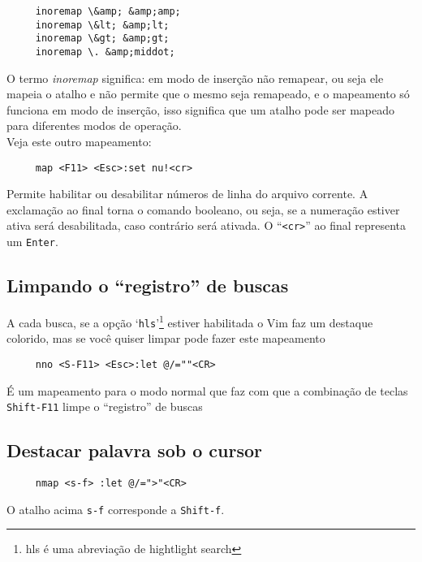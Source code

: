 \begin{verbatim}
     inoremap \&amp; &amp;amp;
     inoremap \&lt; &amp;lt;
     inoremap \&gt; &amp;gt;
     inoremap \. &amp;middot;
\end{verbatim}

O termo {\em inoremap} significa: em modo de inserção não remapear, ou seja
ele mapeia o atalho e não permite que o mesmo seja remapeado, e o
mapeamento só funciona em modo de inserção, isso significa que um atalho
pode ser mapeado para diferentes modos de operação. \\

Veja este outro mapeamento:

\begin{verbatim}
     map <F11> <Esc>:set nu!<cr>
\end{verbatim}

Permite habilitar ou desabilitar números de linha do arquivo corrente.
A exclamação ao final torna o comando booleano, ou seja, se a
numeração estiver ativa será desabilitada, caso contrário será
ativada. O ``\verb|<cr>|'' ao final representa um {\tt Enter}.

\subsection{Limpando o ``registro'' de buscas}\label{Limpando o ``registro'' de buscas}

A cada busca, se a opção `{\tt hls}'\footnote{hls é uma abreviação de hightlight search}
estiver habilitada o Vim faz um destaque colorido, mas se você quiser limpar pode fazer este
mapeamento

\begin{verbatim}
     nno <S-F11> <Esc>:let @/=""<CR>
\end{verbatim}

É um mapeamento para o modo normal que faz com que a combinação de
teclas \verb|Shift-F11| limpe o ``registro'' de buscas

\subsection{Destacar palavra sob o cursor }
\label{Destacar palavra sob o cursor }

\begin{verbatim}
     nmap <s-f> :let @/=">"<CR>
\end{verbatim}

O atalho acima \verb|s-f| corresponde a \verb|Shift-f|.

